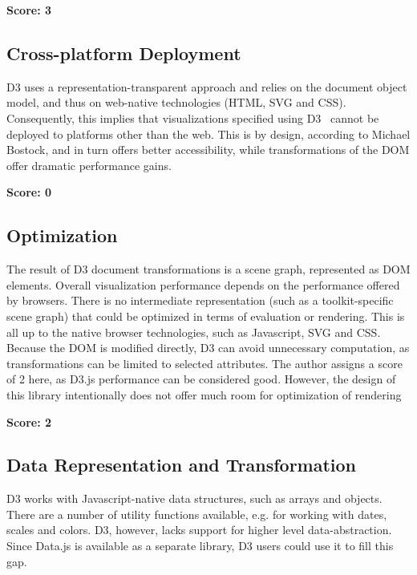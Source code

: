 \SuperPar \textbf{Score: 3}

\subsection{Cross-platform Deployment}

D3 uses a representation-transparent approach and relies on the document object model, and thus on web-native technologies (HTML, SVG and CSS). Consequently, this implies that visualizations specified using D3~\cite{D3} cannot be deployed to platforms other than the web. This is by design, according to Michael Bostock, and in turn offers better accessibility, while transformations of the DOM offer dramatic performance gains.

\SuperPar \textbf{Score: 0}

\subsection{Optimization}

The result of D3 document transformations is a scene graph, represented as DOM elements. Overall visualization performance depends on the performance offered by browsers. There is no intermediate representation (such as a toolkit-specific scene graph) that could be optimized in terms of evaluation or rendering. This is all up to the native browser technologies, such as Javascript, SVG and CSS. Because the DOM is modified directly, D3 can avoid unnecessary computation, as transformations can be limited to selected attributes. The author assigns a score of 2 here, as D3.js performance can be considered good. However, the design of this library intentionally does not offer much room for optimization of rendering

\SuperPar \textbf{Score: 2}

\subsection{Data Representation and Transformation}

D3 works with Javascript-native data structures, such as arrays and objects. There are a number of utility functions available, e.g. for working with dates, scales and colors. D3, however, lacks support for higher level data-abstraction. Since Data.js is available as a separate library, D3 users could use it to fill this gap.

